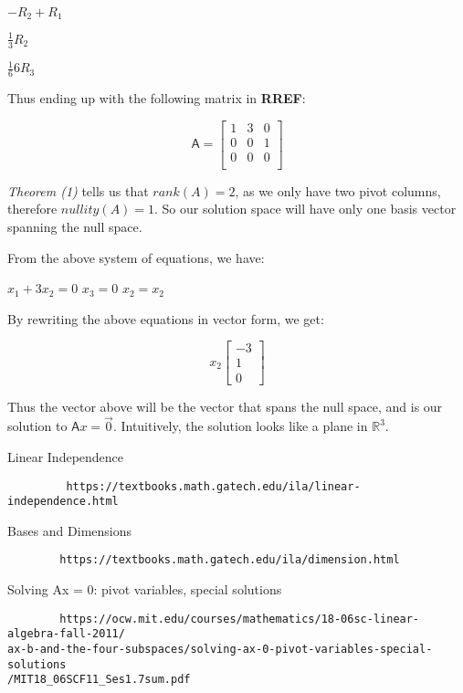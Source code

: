 \documentclass[a4paper, 11pt]{article}
\newcommand{\mat}[1]{\boldsymbol { \mathsf{#1}} }
\begin{document}
\begin{enumerate}
\begin{center}
$-R_2 + R_1$

$\frac{1}{3}R_2$

$\frac{1}{6}6R_3$

\end{center}

Thus ending up with the following matrix in \textbf{RREF}:

\begin{equation*}
    \mat{A} =
    \begin{bmatrix}
    1 & 3 & 0 \\
    0 & 0 & 1 \\
    0 & 0 & 0 \\
    \end{bmatrix}
\end{equation*}

\textit{Theorem (1)} tells us that $rank(A) = 2$, as we only have two pivot columns, therefore $nullity(A) = 1$. So our solution space will have only one basis vector spanning the null space.

From the above system of equations, we have:

\begin{center}
	$x_1 + 3x_2 = 0$
	$x_3 = 0$
	$x_2 = x_2$
\end{center}

By rewriting the above equations in vector form, we get:

\begin{equation*}
	x_2 \begin{bmatrix}
	-3 \\
	1 \\
	0 \
	\end{bmatrix}
\end{equation*}

	Thus the vector above will be the vector that spans the null space, and is our solution to $\mat{A}x = \vec{0}$. Intuitively, the solution looks like a plane in $\mathds{R}^3$.

\end{enumerate}

\newpage 

\begin{thebibliography}{}
		Linear Independence 
		\begin{verbatim}
		 https://textbooks.math.gatech.edu/ila/linear-independence.html
		\end{verbatim}
		Bases and Dimensions
		\begin{verbatim}
		https://textbooks.math.gatech.edu/ila/dimension.html	
		\end{verbatim}
		Solving Ax = 0: pivot variables, special solutions
		\begin{verbatim}
		https://ocw.mit.edu/courses/mathematics/18-06sc-linear-algebra-fall-2011/
ax-b-and-the-four-subspaces/solving-ax-0-pivot-variables-special-solutions
/MIT18_06SCF11_Ses1.7sum.pdf
		\end{verbatim}

\end{thebibliography}
\end{document}
